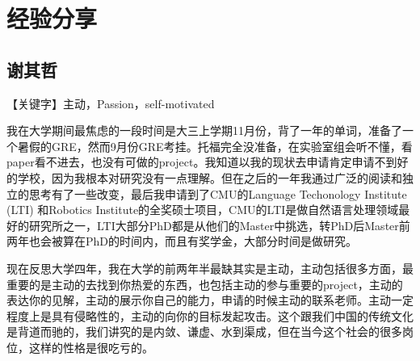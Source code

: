 \documentclass{vivid_layout}
\begin{document}
\begin{comment}
\subsection{如何处理生活和工作的平衡的？}
包括恋爱：如何均衡恋爱与学习？恋爱会影响学习吗？面对异地恋要怎么办？
\begin{itemize}
\item {\name 12 陈思奇}\quad  1.分手；2.坚持很久以后再分手；3.把女友接到异国；4.柏拉图式恋爱
\item  {\name 05 刘畅}  \quad 恋爱两个人会有一段时间是想要腻在一起的，这段时间可能会影响。如果两个人到了平淡期，意识到两个人都有工作要做就好了。如果可以一个月见面4次的话我觉得还好。否则就需要考虑一下怎么改变现状.
\item  {\name 02 杨林骥}  \quad 不谈 影响 但是会后悔
\end{itemize}
\end{comment}



\section{经验分享}
\addtocounter{section}{1}
\setcounter{subsection}{0}

\subsection{{ 谢其哲}}

【关键字】主动，Passion，self-motivated

我在大学期间最焦虑的一段时间是大三上学期11月份，背了一年的单词，准备了一个暑假的GRE，然而9月份GRE考挂。托福完全没准备，在实验室组会听不懂，看paper看不进去，也没有可做的project。我知道以我的现状去申请肯定申请不到好的学校，因为我根本对研究没有一点理解。但在之后的一年我通过广泛的阅读和独立的思考有了一些改变，最后我申请到了CMU的Language Techonology Institute (LTI) 和Robotics Institute的全奖硕士项目，CMU的LTI是做自然语言处理领域最好的研究所之一，LTI大部分PhD都是从他们的Master中挑选，转PhD后Master前两年也会被算在PhD的时间内，而且有奖学金，大部分时间是做研究。

现在反思大学四年，我在大学的前两年半最缺其实是主动，主动包括很多方面，最重要的是主动的去找到你热爱的东西，也包括主动的参与重要的project，主动的表达你的见解，主动的展示你自己的能力，申请的时候主动的联系老师。主动一定程度上是具有侵略性的，主动的向你的目标发起攻击。这个跟我们中国的传统文化是背道而驰的，我们讲究的是内敛、谦虚、水到渠成，但在当今这个社会的很多岗位，这样的性格是很吃亏的。
\end{document}
